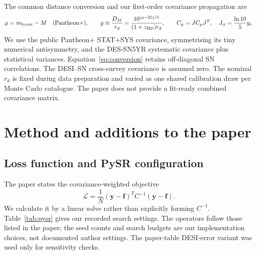 \documentclass[11pt]{article}
\begin{document}
The common distance conversion and our first-order covariance propagation are
\begin{equation}
\mu=m_{b,\mathrm{corr}}-M\quad(\mathrm{Pantheon+}),\qquad
y\equiv\frac{D_M}{r_d}=\frac{10^{(\mu-25)/5}}{(1+z_{\rm HD})r_d},\qquad
C_y=JC_\mu J^T,\quad J_{ii}=\frac{\ln10}{5}y_i.
\label{eq:conversion}
\end{equation}
We use the public Pantheon+ STAT+SYS covariance, symmetrising its tiny numerical antisymmetry, and the DES-SN5YR systematic covariance plus statistical variances. Equation~\eqref{eq:conversion} retains off-diagonal SN correlations. The DESI--SN cross-survey covariance is assumed zero. The nominal $r_d$ is fixed during data preparation and varied as one shared calibration draw per Monte Carlo catalogue. The paper does not provide a fit-ready combined covariance matrix.

\section{Method and additions to the paper}
\subsection{Loss function and PySR configuration}
The paper states the covariance-weighted objective
\begin{equation}
\mathcal L=\frac{1}{N}(\boldsymbol y-\boldsymbol f)^T C^{-1}(\boldsymbol y-\boldsymbol f).
\label{eq:loss}
\end{equation}
We calculate it by a linear solve rather than explicitly forming $C^{-1}$. Table~\ref{tab:pysr} gives our recorded search settings. The operators follow those listed in the paper; the seed counts and search budgets are our implementation choices, not documented author settings. The paper-table DESI-error variant was used only for sensitivity checks.
\end{document}
